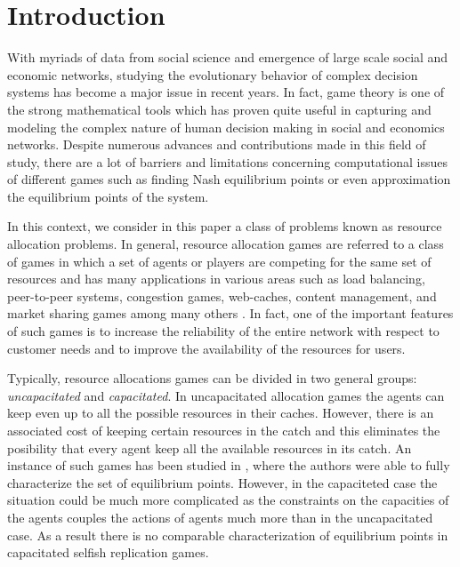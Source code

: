\section{Introduction}
With myriads of data from social science and emergence of large scale social and economic networks, studying the evolutionary behavior of complex decision systems has become a major issue in recent years. In fact, game theory is one of the strong mathematical tools which has proven quite useful in capturing and modeling the complex nature of human decision making in social and economics networks. Despite numerous advances and contributions made in this field of study, there are a lot of barriers and limitations concerning computational issues of different games such as finding Nash equilibrium points or even approximation the equilibrium points of the system.


In this context, we consider in this paper a class of problems known as resource allocation problems. In general, resource allocation games are referred to a class of games in which a set of agents or players are competing for the same set of resources and has many applications in various areas such as load balancing, peer-to-peer systems, congestion games, web-caches, content management, and market sharing games among many others \cite{pollatos2008social,pacifici2012convergence,gopalakrishnan2012cache,goemans2006market,masucci2014strategic,ackermann2008impact,fabrikant2004complexity}. In fact, one of the important features of such games is to increase the reliability of the entire network with respect to customer needs and to improve the availability of the resources for users.

Typically, resource allocations games can be divided in two general groups: \textit{uncapacitated} and \textit{capacitated}. In uncapacitated allocation games the agents can keep even up to all the possible resources in their caches. However, there is an associated cost of keeping certain resources in the catch and this eliminates the posibility that every agent keep all the available resources in its catch. An instance of such games has been studied in \cite{chun2004selfish}, where the authors were able to fully characterize the set of equilibrium points. However, in the capaciteted case the situation could be much more complicated as the constraints on the capacities of the agents couples the actions of agents much more than in the uncapacitated case. As a result there is no comparable characterization of equilibrium points in capacitated selfish replication games.

